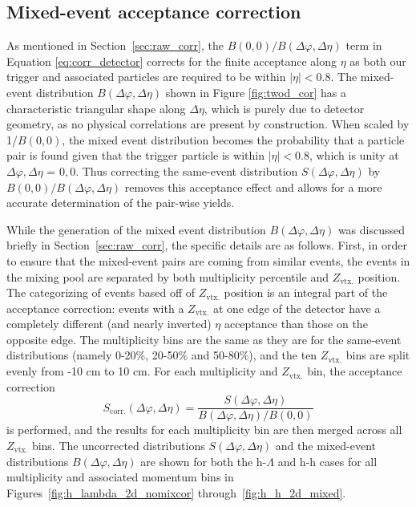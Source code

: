 \subsection{Mixed-event acceptance correction}
\label{sec:acceptance_corr}

As mentioned in Section~\ref{sec:raw_corr}, the $B(0, 0)/B(\Delta\varphi, \Delta\eta)$ term in Equation \ref{eq:corr_detector} corrects for the finite acceptance along $\eta$ as both our trigger and associated particles are required to be within $|\eta| < 0.8$. The mixed-event distribution $B(\Delta\varphi, \Delta\eta)$ shown in Figure \ref{fig:twod_cor} has a characteristic triangular shape along $\Delta\eta$, which is purely due to detector geometry, as no physical correlations are present by construction. When scaled by 1/$B(0, 0)$, the mixed event distribution becomes the probability that a particle pair is found given that the trigger particle is within $|\eta| < 0.8$, which is unity at $\Delta\varphi, \Delta\eta$ = $0, 0$. Thus correcting the same-event distribution $S(\Delta\varphi, \Delta\eta)$ by $B(0, 0)/B(\Delta\varphi, \Delta\eta)$ removes this acceptance effect and allows for a more accurate determination of the pair-wise yields. 

While the generation of the mixed event distribution $B(\Delta\varphi, \Delta\eta)$ was discussed briefly in Section~\ref{sec:raw_corr}, the specific details are as follows. First, in order to ensure that the mixed-event pairs are coming from similar events, the events in the mixing pool are separated by both multiplicity percentile and $Z_{\text{vtx.}}$ position. The categorizing of events based off of $Z_{\text{vtx.}}$ position is an integral part of the acceptance correction: events with a $Z_{\text{vtx.}}$ at one edge of the detector have a completely different (and nearly inverted) $\eta$ acceptance than those on the opposite edge. The multiplicity bins are the same as they are for the same-event distributions (namely 0-20\%, 20-50\% and 50-80\%), and the ten $Z_{\text{vtx.}}$ bins are split evenly from -10 cm to 10 cm.  For each multiplicity and $Z_{\text{vtx.}}$ bin, the acceptance correction
%
\begin{equation}
	S_{\text{corr.}}(\Delta\varphi, \Delta\eta) = \frac{S(\Delta\varphi, \Delta\eta)}{B(\Delta\varphi, \Delta\eta)/B(0, 0)}
\end{equation}
%
is performed, and the results for each multiplicity bin are then merged across all $Z_{\text{vtx.}}$ bins. The uncorrected distributions $S(\Delta\varphi, \Delta\eta)$ and the mixed-event distributions $B(\Delta\varphi, \Delta\eta)$ are shown for both the h-$\Lambda$ and h-h cases for all multiplicity and associated momentum bins in Figures~\ref{fig:h_lambda_2d_nomixcor} through~\ref{fig:h_h_2d_mixed}.


